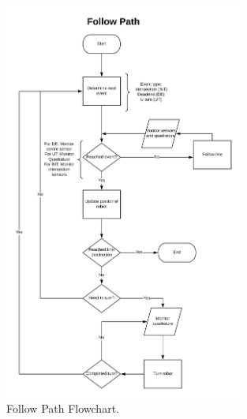 \begin{figure}[H]
\centering
\includegraphics[width=0.7\textwidth]{figures/followpath_flowchart.png}
\caption{Follow Path Flowchart.}
\end{figure}

